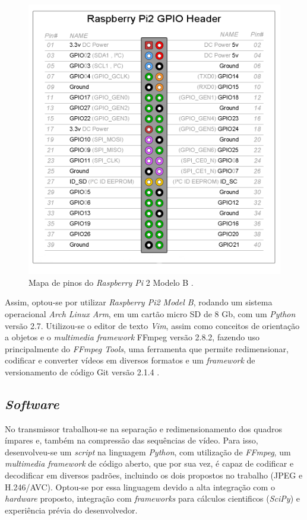 \begin{figure}[h]
	\centering
	\includegraphics[scale=.3]{figuras/GPIO_Pi2.png}
	\caption{ Mapa de pinos do \textit{Raspberry Pi} 2 Modelo B \cite{element14}.}
	\label{fig:rasp_gpio}
\end{figure}

Assim, optou-se por utilizar \textit{Raspberry Pi2 Model B}, rodando um sistema operacional \textit{Arch Linux Arm}, em um cartão micro SD de 8 Gb,  com um \textit{Python} versão 2.7.
Utilizou-se o editor de texto \textit{Vim}, assim como conceitos de orientação a objetos e o \textit{multimedia framework} FFmpeg versão 2.8.2, fazendo uso principalmente do \textit{FFmpeg Tools}, uma ferramenta que permite redimensionar, codificar e converter vídeos em diversos formatos e um \textit{framework} de versionamento de código Git versão 2.1.4 .
\subsection{\textit{Software}}

No transmissor trabalhou-se na separação e redimensionamento dos quadros ímpares e, também na compressão das sequências de vídeo. Para isso, desenvolveu-se um \textit{script} na linguagem \textit{Python}, com utilização de \textit{FFmpeg}, um \textit{multimedia framework} de código aberto, que por sua vez, é  capaz de codificar e decodificar em diversos padrões, incluindo os dois propostos no trabalho (JPEG e H.246/AVC). Optou-se por essa linguagem devido a alta integração com o \textit{hardware} proposto, integração com \textit{frameworks} para cálculos cientificos (\textit{SciPy}) e experiência prévia do desenvolvedor. 

